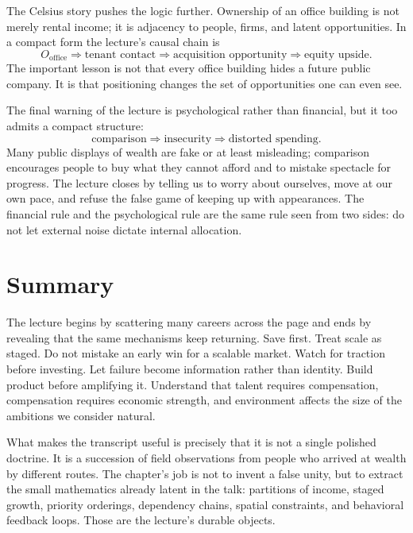 The Celsius story pushes the logic further. Ownership of an office building is not merely rental income; it is adjacency to people, firms, and latent opportunities. In a compact form the lecture's causal chain is
\begin{equation}
O_{\mathrm{office}} \Rightarrow \text{tenant contact} \Rightarrow \text{acquisition opportunity} \Rightarrow \text{equity upside}.
\end{equation}
The important lesson is not that every office building hides a future public company. It is that positioning changes the set of opportunities one can even see.

The final warning of the lecture is psychological rather than financial, but it too admits a compact structure:
\begin{equation}
\text{comparison} \Rightarrow \text{insecurity} \Rightarrow \text{distorted spending}.
\end{equation}
Many public displays of wealth are fake or at least misleading; comparison encourages people to buy what they cannot afford and to mistake spectacle for progress. The lecture closes by telling us to worry about ourselves, move at our own pace, and refuse the false game of keeping up with appearances. The financial rule and the psychological rule are the same rule seen from two sides: do not let external noise dictate internal allocation.

\section{Summary}

The lecture begins by scattering many careers across the page and ends by revealing that the same mechanisms keep returning. Save first. Treat scale as staged. Do not mistake an early win for a scalable market. Watch for traction before investing. Let failure become information rather than identity. Build product before amplifying it. Understand that talent requires compensation, compensation requires economic strength, and environment affects the size of the ambitions we consider natural.

What makes the transcript useful is precisely that it is not a single polished doctrine. It is a succession of field observations from people who arrived at wealth by different routes. The chapter's job is not to invent a false unity, but to extract the small mathematics already latent in the talk: partitions of income, staged growth, priority orderings, dependency chains, spatial constraints, and behavioral feedback loops. Those are the lecture's durable objects.
